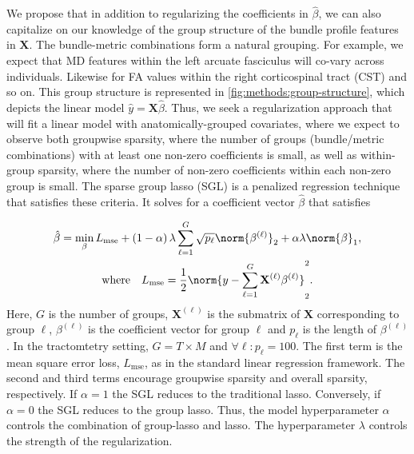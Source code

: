 \documentclass[10pt,letterpaper]{article}
\begin{document}
We propose that in addition to regularizing the coefficients in
$\hat{\beta}$, we can also capitalize on our knowledge of the group structure
of the bundle profile features in $\mathbf{X}$. The bundle-metric
combinations form a natural grouping. For example, we expect that MD features
within the left arcuate fasciculus will co-vary across individuals. Likewise
for FA values within the right corticospinal tract (CST) and so on. This
group structure is represented in \cref{fig:methods:group-structure}, which
depicts the linear model $\hat{y} = \mathbf{X} \hat{\beta}$. Thus, we seek a
regularization approach that will fit a linear model with
anatomically-grouped covariates, where we expect to observe both groupwise
sparsity, where the number of groups (bundle/metric combinations) with at
least one non-zero coefficients is small, as well as within-group sparsity,
where the number of non-zero coefficients within each non-zero group is
small. The sparse group lasso (SGL) is a penalized regression technique that
satisfies these criteria\cite{simon2013sparse}. It solves for a
coefficient vector $\hat{\beta}$ that satisfies

\begin{multline}
    \hat{\beta} = \min_\beta L_{\text{mse}}
    + \left( 1 - \alpha \right) \lambda \displaystyle \sum_{\ell = 1}^{G}
    \sqrt{p_\ell} \norm{\beta^{(\ell)}}_2
    + \alpha \lambda \norm{\beta}_1,\\%
    \text{where} \quad
    L_{\text{mse}} = \frac{1}{2}
    \norm{y - \displaystyle \sum_{\ell = 1}^{G}
    \mathbf{X}^{(\ell)} \beta^{(\ell)}}_2^2.
    \label{eq:sgl}
\end{multline}
Here, $G$ is the number of groups, $\mathbf{X}^{(\ell)}$ is the submatrix of
$\mathbf{X}$ corresponding to group $\ell$, $\beta^{(\ell)}$ is the
coefficient vector for group $\ell$ and $p_\ell$ is the length of
$\beta^{(\ell)}$. In the tractomtetry setting, $G = T \times M$ and $\forall
\ell: p_\ell = 100$. The first term is the mean square error loss,
$L_{\text{mse}}$, as in the standard linear regression framework. The second
and third terms encourage groupwise sparsity and overall sparsity,
respectively. If $\alpha = 1$ the SGL reduces to the traditional
lasso\cite{tibshirani1996regression}. Conversely, if $\alpha = 0$ the SGL
reduces to the group lasso\cite{yuan2006model}. Thus, the model
hyperparameter $\alpha$ controls the combination of group-lasso and lasso.
The hyperparameter $\lambda$ controls the strength of the regularization.

\subsubsection*{}
\end{document}
